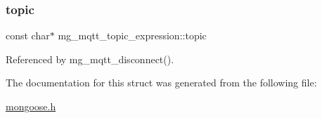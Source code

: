 \subsubsection{\texorpdfstring{topic}{topic}}
{\footnotesize\ttfamily const char$\ast$ mg\+\_\+mqtt\+\_\+topic\+\_\+expression\+::topic}



Referenced by mg\+\_\+mqtt\+\_\+disconnect().



The documentation for this struct was generated from the following file\+:\begin{DoxyCompactItemize}
\item 
\hyperlink{mongoose_8h}{mongoose.\+h}\end{DoxyCompactItemize}
